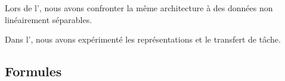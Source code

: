   Lors de l', nous avons confronter la même architecture à des données non linéairement séparables.
  
  Dans l', nous avons expérimenté les représentations et le transfert de tâche.
  

  \newpage 
  \subsection{Formules}
    
    
    




